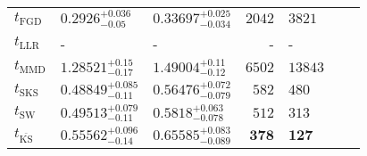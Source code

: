 \begin{tabular}{l|llr|llr}
	\midrule
	$t_{\mathrm{FGD}}$ & ${\mathbf{0.2926_{-0.05}^{+0.036}}}$ & ${\mathbf{0.33697_{-0.034}^{+0.025}}}$ & $2042$ & $3821$ \\
	$t_{\mathrm{LLR}}$ & - & - & - & - \\
	$t_{\mathrm{MMD}}$ & $1.28521_{-0.17}^{+0.15}$ & $1.49004_{-0.12}^{+0.11}$ & $6502$ & $13843$ \\
	$t_{\mathrm{SKS}}$ & $0.48849_{-0.11}^{+0.085}$ & $0.56476_{-0.079}^{+0.072}$ & $582$ & $480$ \\
	$t_{\mathrm{SW}}$ & $0.49513_{-0.11}^{+0.079}$ & $0.5818_{-0.078}^{+0.063}$ & $512$ & $313$ \\
	$t_{\overline{\mathrm{KS}}}$ & $0.55562_{-0.14}^{+0.096}$ & $0.65585_{-0.089}^{+0.083}$ & ${\mathbf{378}}$ & ${\mathbf{127}}$ \\
	\bottomrule
\end{tabular}